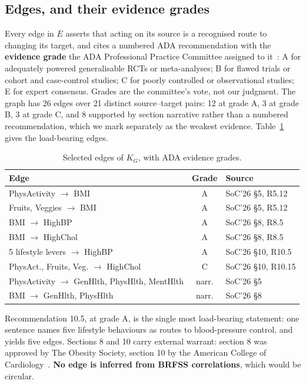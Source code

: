 \documentclass[conference]{IEEEtran}
\begin{document}
\subsection{Edges, and their evidence grades}
Every edge in $E$ asserts that acting on its source is a recognised route to changing its target, and cites a numbered ADA recommendation with the \textbf{evidence grade} the ADA Professional Practice Committee assigned to it~\cite{ada2026int}: A for adequately powered generalisable RCTs or meta-analyses; B for flawed trials or cohort and case-control studies; C for poorly controlled or observational studies; E for expert consensus. Grades are the committee's vote, not our judgment. The graph has 26 edges over 21 distinct source--target pairs: 12 at grade A, 3 at grade B, 3 at grade C, and 8 supported by section narrative rather than a numbered recommendation, which we mark separately as the weakest evidence. Table~\ref{tab:edges} gives the load-bearing edges.

\begin{table}[t]
\caption{Selected edges of $K_G$, with ADA evidence grades.}
\label{tab:edges}
\centering
\footnotesize
\begin{tabular}{@{}p{2.9cm}cp{2.4cm}@{}}
\toprule
\textbf{Edge} & \textbf{Grade} & \textbf{Source} \\
\midrule
PhysActivity $\rightarrow$ BMI & A & SoC'26 \S5, R5.12 \\
Fruits, Veggies $\rightarrow$ BMI & A & SoC'26 \S5, R5.12 \\
BMI $\rightarrow$ HighBP & A & SoC'26 \S8, R8.5 \\
BMI $\rightarrow$ HighChol & A & SoC'26 \S8, R8.5 \\
5 lifestyle levers $\rightarrow$ HighBP & A & SoC'26 \S10, R10.5 \\
PhysAct., Fruits, Veg. $\rightarrow$ HighChol & C & SoC'26 \S10, R10.15 \\
PhysActivity $\rightarrow$ GenHlth, PhysHlth, MentHlth & narr. & SoC'26 \S5 \\
BMI $\rightarrow$ GenHlth, PhysHlth & narr. & SoC'26 \S8 \\
\bottomrule
\end{tabular}
\end{table}

Recommendation 10.5, at grade A, is the single most load-bearing statement: one sentence names five lifestyle behaviours as routes to blood-pressure control, and yields five edges. Sections 8 and 10 carry external warrant: section 8 was approved by The Obesity Society, section 10 by the American College of Cardiology~\cite{ada2026int}. \textbf{No edge is inferred from BRFSS correlations}, which would be circular.
\end{document}
